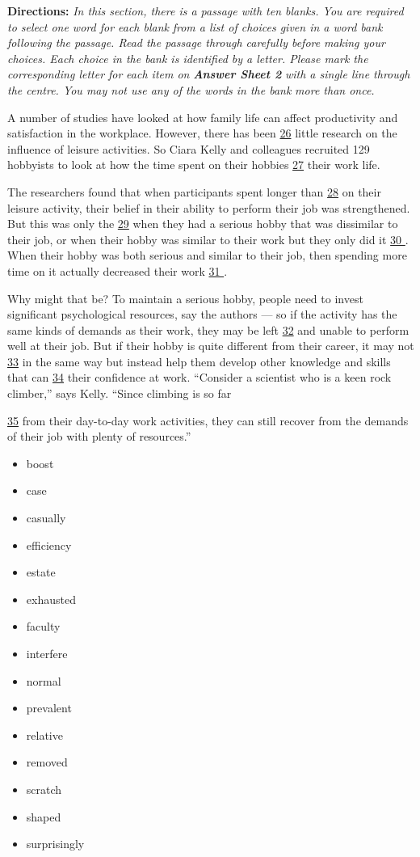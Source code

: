 \documentclass[UTF8,11pt]{ctexart}
\begin{document}
\textbf{Directions:} \textit{In this section, there is a passage with ten blanks. You are required to select one word for each blank} \textit{from a list of choices given in a word bank following the passage. Read the passage through carefully before} \textit{making your choices. Each choice in the bank is identified by a letter. Please mark the corresponding letter for} \textit{each item on }\textbf{\textit{Answer Sheet 2}}\textit{ with a single line through the centre. You may not use any of the words in the bank} \textit{more than once.}


A number of studies have looked at how family life can affect productivity and satisfaction in the workplace. However, there has been \uline{26} little research on the influence of leisure activities. So Ciara Kelly and colleagues recruited 129 hobbyists to look at how the time spent on their hobbies \uline{27} their work life.


The researchers found that when participants spent longer than \uline{28} on their leisure activity, their belief in their ability to perform their job was strengthened. But this was only the \uline{29} when they had a serious hobby that was dissimilar to their job, or when their hobby was similar to their work but they only did it \uline{30 }. When their hobby was both serious and similar to their job, then spending more time on it actually decreased their work \uline{31 }.


Why might that be? To maintain a serious hobby, people need to invest significant psychological resources, say the authors — so if the activity has the same kinds of demands as their work, they may be left \uline{32} and unable to perform well at their job. But if their hobby is quite different from their career, it may not \uline{33} in the same way but instead help them develop other knowledge and skills that can \uline{34} their confidence at work. “Consider a scientist who is a keen rock climber,” says Kelly. “Since climbing is so far


\uline{35} from their day-to-day work activities, they can still recover from the demands of their job with plenty of resources.”


\begin{itemize}[leftmargin=2em,itemsep=.2em,topsep=.4em]\item[A.] boost
\item[B.] case
\item[C.] casually
\item[D.] efficiency
\item[E.] estate
\item[F.] exhausted
\item[G.] faculty
\item[H.] interfere
\item[I.] normal
\item[J.] prevalent
\item[K.] relative
\item[L.] removed
\item[M.] scratch
\item[N.] shaped
\item[O.] surprisingly
\end{itemize}
\end{document}
